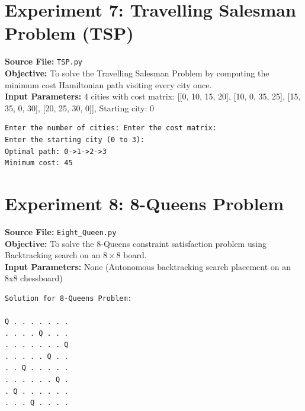 \documentclass[11pt,a4paper]{article}
\begin{document}
\section{Experiment 7: Travelling Salesman Problem (TSP)}
\textbf{Source File:} \texttt{TSP.py} \\[4pt]
\textbf{Objective:} To solve the Travelling Salesman Problem by computing the minimum cost Hamiltonian path visiting every city once. \\[4pt]
\textbf{Input Parameters:} 4 cities with cost matrix: [[0, 10, 15, 20], [10, 0, 35, 25], [15, 35, 0, 30], [20, 25, 30, 0]], Starting city: 0 \\[6pt]
\begin{tcolorbox}[colback=gray!5!white,colframe=blue!70!black,title={\textbf{Program Output: Travelling Salesman Problem (TSP)}}]
\begin{verbatim}
Enter the number of cities: Enter the cost matrix:
Enter the starting city (0 to 3): 
Optimal path: 0->1->2->3
Minimum cost: 45
\end{verbatim}
\end{tcolorbox}
\vspace{1em}

\section{Experiment 8: 8-Queens Problem}
\textbf{Source File:} \texttt{Eight_Queen.py} \\[4pt]
\textbf{Objective:} To solve the 8-Queens constraint satisfaction problem using Backtracking search on an $8 \times 8$ board. \\[4pt]
\textbf{Input Parameters:} None (Autonomous backtracking search placement on an 8x8 chessboard) \\[6pt]
\begin{tcolorbox}[colback=gray!5!white,colframe=blue!70!black,title={\textbf{Program Output: 8-Queens Problem}}]
\begin{verbatim}
Solution for 8-Queens Problem:

Q . . . . . . .
. . . . Q . . .
. . . . . . . Q
. . . . . Q . .
. . Q . . . . .
. . . . . . Q .
. Q . . . . . .
. . . Q . . . .
\end{verbatim}
\end{tcolorbox}
\vspace{1em}
\end{document}
